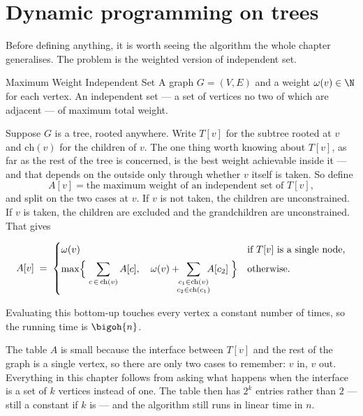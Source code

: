 \section{Dynamic programming on trees}
\label{sec:dp-on-trees}

Before defining anything, it is worth seeing the algorithm the whole chapter
generalises. The problem is the weighted version of independent set.

\begin{probdef}{Maximum Weight Independent Set}
  \instance A graph $G = (V,E)$ and a weight $\omega(v) \in \N$ for each vertex.
  \question An independent set --- a set of vertices no two of which are
  adjacent --- of maximum total weight.
\end{probdef}

Suppose $G$ is a tree, rooted anywhere. Write $T[v]$ for the subtree rooted at
$v$ and $\mathrm{ch}(v)$ for the children of $v$. The one thing worth knowing
about $T[v]$, as far as the rest of the tree is concerned, is the best weight
achievable inside it --- and that depends on the outside only through whether
$v$ itself is taken. So define
\[ A[v] = \text{the maximum weight of an independent set of } T[v], \]
and split on the two cases at $v$. If $v$ is not taken, the children are
unconstrained. If $v$ is taken, the children are excluded and the
grandchildren are unconstrained. That gives

\begin{equation}\label{eq:tw-tree-dp}
  A[v] \;=\;
  \begin{cases}
    \omega(v) & \text{if } T[v] \text{ is a single node,} \\[4pt]
    \max\Bigl\{\;
      \displaystyle\sum_{c \,\in\, \mathrm{ch}(v)} A[c],
      \quad
      \omega(v) + \!\!\!\displaystyle\sum_{\substack{c_1 \in \mathrm{ch}(v) \\
                                          c_2 \in \mathrm{ch}(c_1)}}\!\!\! A[c_2]
    \;\Bigr\} & \text{otherwise.}
  \end{cases}
\end{equation}

Evaluating this bottom-up touches every vertex a constant number of times, so
the running time is $\bigoh{n}$.

\begin{intuition}
The table $A$ is small because the interface between $T[v]$ and the rest of the
graph is a single vertex, so there are only two cases to remember: $v$ in, $v$
out. Everything in this chapter follows from asking what happens when the
interface is a set of $k$ vertices instead of one. The table then has $2^k$
entries rather than $2$ --- still a constant if $k$ is --- and the algorithm
still runs in linear time in $n$.
\end{intuition}

